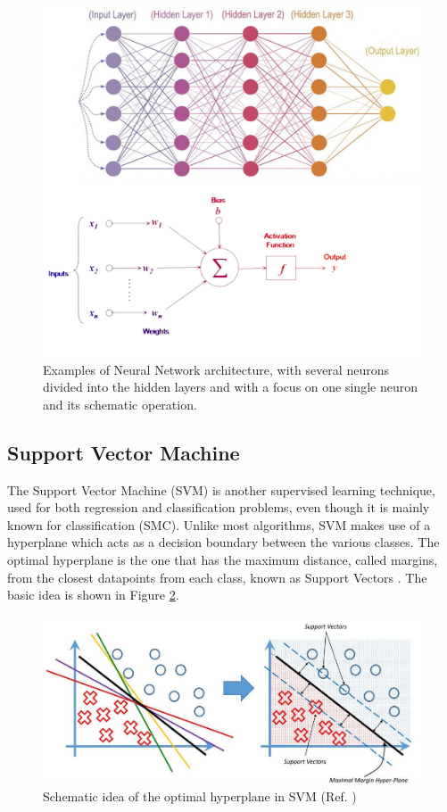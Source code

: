 \documentclass[english,notitlepage,reprint,nofootinbib]{revtex4-1}  %
\begin{document}
\begin{figure}[h]
    \centering 
    \includegraphics[scale=0.5]{img/neural_network_structure.png}
    \caption{Examples of Neural Network architecture, with several neurons divided into the hidden layers and with a focus on one single neuron and its schematic operation.}
    \label{fig:nn}
\end{figure}

\subsection{Support Vector Machine}
The Support Vector Machine (SVM) is another supervised learning technique, used for both regression and classification problems, even though it is mainly known for classification (SMC). Unlike most algorithms, SVM makes use of a hyperplane which acts as a decision boundary between the various classes. The optimal hyperplane is the one that has the maximum distance, called margins, from the closest datapoints from each class, known as Support Vectors \cite{svm3}. The basic idea is shown in Figure \ref{fig:svm}.
 
 \begin{figure}[h]
    \centering 
    \includegraphics[scale=0.2]{img/Support_Vector_Machines.jpg}
    \caption{Schematic idea of the optimal hyperplane in SVM (Ref. \cite{svm2})}
    \label{fig:svm}
\end{figure}
\end{document}
